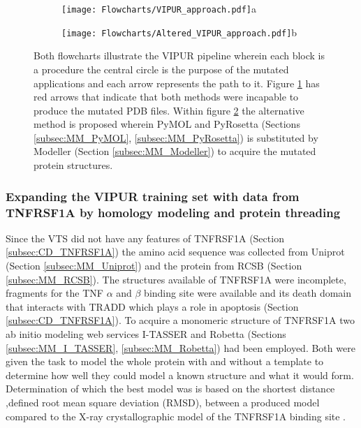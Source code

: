 	\begin{figure}[!ht]
		\centering
		\begin{subfigure}{0.45\textwidth}
			\texttt{[image: Flowcharts/VIPUR\_approach.pdf]}{a}
			\label{fig:RES_VIPUR_approach}
		\end{subfigure}
		\begin{subfigure}{0.45\textwidth}
			\texttt{[image: Flowcharts/Altered\_VIPUR\_approach.pdf]}{b}
			\label{fig:RES_Altered_VIPUR_approach}
		\end{subfigure}
		\caption[Flowcharts VIPUR pipeline and altered VIPUR pipeline]{Both flowcharts illustrate the VIPUR pipeline wherein each block is a procedure the central circle is the purpose of the mutated applications and each arrow represents the path to it. Figure \ref{fig:RES_VIPUR_approach} has red arrows that indicate that both methods were incapable to produce the mutated PDB files. Within figure \ref{fig:RES_Altered_VIPUR_approach} the alternative method is proposed wherein PyMOL and PyRosetta (Sections \ref{subsec:MM_PyMOL}, \ref{subsec:MM_PyRosetta}) is substituted by Modeller (Section \ref{subsec:MM_Modeller}) to acquire the mutated protein structures.}

		\label{fig:Flowcharts_of_old_and_altered_VIPUR}
	\end{figure}
	\label{subsubsec:RES_Incompatibility}
	\newpage
	
	\subsubsection{Expanding the VIPUR training set with data from TNFRSF1A by homology modeling and protein threading}
	Since the VTS did not have any features of TNFRSF1A (Section \ref{subsec:CD_TNFRSF1A}) the amino acid sequence was collected from Uniprot (Section \ref{subsec:MM_Uniprot}) and the protein from RCSB (Section \ref{subsec:MM_RCSB}). The structures available of TNFRSF1A were incomplete, fragments for the TNF $\alpha$ and $\beta$ binding site \cite{} were available and its death domain that interacts with TRADD \cite{} which plays a role in apoptosis (Section \ref{subsec:CD_TNFRSF1A}). To acquire a monomeric structure of TNFRSF1A two ab initio modeling web services I-TASSER and Robetta (Sections \ref{subsec:MM_I_TASSER}, \ref{subsec:MM_Robetta}) had been employed. Both were given the task to model the whole protein with and without a template to determine how well they could model a known structure and what it would form. Determination of which the best model was is based on the shortest distance ,defined root mean square deviation (RMSD), between a produced model compared to the X-ray crystallographic model of the TNFRSF1A binding site .
	
